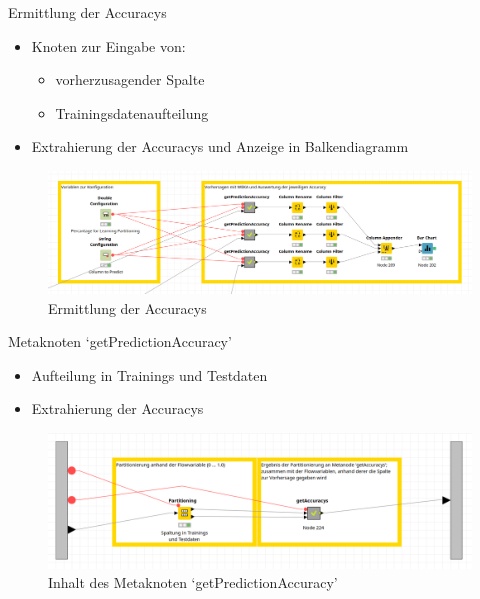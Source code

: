\documentclass[
	handout,
  	aspectratio=169
]{beamer}
\begin{document}
			\begin{frame}{Ermittlung der Accuracys}
				\begin{itemize}
					\item Knoten zur Eingabe von:	
					\begin{itemize}
						\item vorherzusagender Spalte
						\item Trainingsdatenaufteilung
					\end{itemize}	
					\item Extrahierung der Accuracys und Anzeige in Balkendiagramm
				\end{itemize}
				\begin{center}					
					\begin{figure}[h]
						\includegraphics[scale=0.2]{../pictures/trees-workflow-gesamt-zoomed.png}
						\caption{Ermittlung der Accuracys}		
					\end{figure}	
				\end{center}	
			\end{frame}
			
			\begin{frame}{Metaknoten `getPredictionAccuracy'}
				\begin{itemize}
					\item Aufteilung in Trainings und Testdaten	
					\item Extrahierung der Accuracys
				\end{itemize}
				\begin{center}					
					\begin{figure}[h]
						\includegraphics[scale=0.25]{../pictures/trees-workflow-partitioning.png}
						\caption{Inhalt des Metaknoten `getPredictionAccuracy'}		
					\end{figure}	
				\end{center}	
			\end{frame}
			
\end{document}
